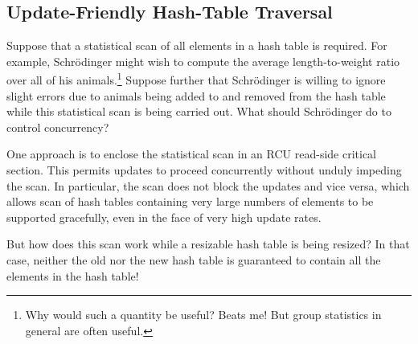 \subsection{Update-Friendly Hash-Table Traversal}
\label{sec:together:Update-Friendly Hash-Table Traversal}

Suppose that a statistical scan of all elements in a hash table is
required.
For example, Schr\"odinger might wish to compute the average
length-to-weight ratio over all of his animals.\footnote{	
	Why would such a quantity be useful?
	Beats me!
	But group statistics in general are often useful.}
Suppose further that Schr\"odinger is willing to ignore slight
errors due to animals being added to and removed from the hash
table while this statistical scan is being carried out.
What should Schr\"odinger do to control concurrency?

One approach is to enclose the statistical scan in an RCU read-side
critical section.
This permits updates to proceed concurrently without unduly impeding
the scan.
In particular, the scan does not block the updates and vice versa,
which allows scan of hash tables containing very large numbers of
elements to be supported gracefully, even in the face of very high
update rates.

\QuickQuiz{}
	But how does this scan work while a resizable hash table
	is being resized?
	In that case, neither the old nor the new hash table is
	guaranteed to contain all the elements in the hash table!
 \QuickQuizEnd
